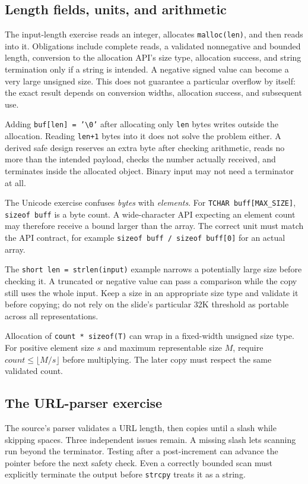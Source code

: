 \documentclass[11pt,a4paper]{article}
\numberwithin{figure}{section}
\begin{document}
\subsection{Length fields, units, and arithmetic}
The input-length exercise reads an integer, allocates \texttt{malloc(len)}, and then reads into it. Obligations include complete reads, a validated nonnegative and bounded length, conversion to the allocation API's size type, allocation success, and string termination only if a string is intended. A negative signed value can become a very large unsigned size. This does not guarantee a particular overflow by itself: the exact result depends on conversion widths, allocation success, and subsequent use.

Adding \texttt{buf[len] = '\textbackslash{}0'} after allocating only \texttt{len} bytes writes outside the allocation. Reading \texttt{len+1} bytes into it does not solve the problem either. A derived safe design reserves an extra byte after checking arithmetic, reads no more than the intended payload, checks the number actually received, and terminates inside the allocated object. Binary input may not need a terminator at all.

The Unicode exercise confuses \emph{bytes} with \emph{elements}. For \texttt{TCHAR buff[MAX\_SIZE]}, \texttt{sizeof buff} is a byte count. A wide-character API expecting an element count may therefore receive a bound larger than the array. The correct unit must match the API contract, for example \texttt{sizeof buff / sizeof buff[0]} for an actual array.

The \texttt{short len = strlen(input)} example narrows a potentially large size before checking it. A truncated or negative value can pass a comparison while the copy still uses the whole input. Keep a size in an appropriate size type and validate it before copying; do not rely on the slide's particular 32K threshold as portable across all representations.

Allocation of \texttt{count * sizeof(T)} can wrap in a fixed-width unsigned size type. For positive element size $s$ and maximum representable size $M$, require $count\le\lfloor M/s\rfloor$ before multiplying. The later copy must respect the same validated count.

\subsection{The URL-parser exercise}
The source's parser validates a URL length, then copies until a slash while skipping spaces. Three independent issues remain. A missing slash lets scanning run beyond the terminator. Testing after a post-increment can advance the pointer before the next safety check. Even a correctly bounded scan must explicitly terminate the output before \texttt{strcpy} treats it as a string.
\end{document}
